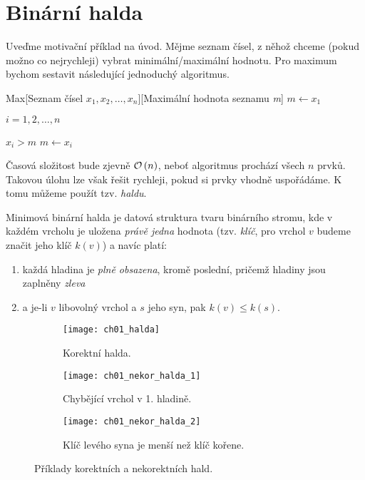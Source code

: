 \section{Binární halda}\label{sec:halda}
Uveďme motivační příklad na úvod. Mějme seznam čísel, z něhož chceme (pokud možno co nejrychleji) vybrat minimální/maximální hodnotu. Pro maximum bychom sestavit následující jednoduchý algoritmus.
\begin{pseudo}{Max}[Seznam čísel $x_1,x_2,\dots,x_n$][Maximální hodnota seznamu \textit{m}]
    $m\gets x_1$\\
    \begin{For}{$i=1,2,\dots,n$}
        \begin{If}{$x_i>m$}
            $m\gets x_i$
        \end{If}
    \end{For}
\end{pseudo}

Časová složitost bude zjevně $\mathcal{O}\left(n\right)$, neboť algoritmus prochází všech $n$ prvků. Takovou úlohu lze však řešit rychleji, pokud si prvky vhodně uspořádáme. K tomu můžeme použít tzv. \emph{haldu}. 
\begin{definition}\label{def:binarni_halda}
    Minimová binární halda je datová struktura tvaru binárního stromu, kde v každém vrcholu je uložena \emph{právě jedna} hodnota (tzv. \emph{klíč}, pro vrchol $v$ budeme značit jeho klíč $k(v)$) a navíc platí:
    \begin{enumerate}[label=(\roman*)]
        \item\label{binhalda_podminka_1} každá hladina je \emph{plně obsazena}, kromě poslední, pričemž hladiny jsou zaplněny \emph{zleva}
        \item\label{binhalda_podminka_2} a je-li $v$ libovolný vrchol a $s$ jeho syn, pak $k(v)\leqslant k(s)$.
    \end{enumerate}
\end{definition}

\begin{figure}[h]
    \centering
    \begin{subfigure}{6cm}
        \centering
        \texttt{[image: ch01\_halda]}
        \caption{Korektní halda.}
        \label{subfig:korektni_halda}
    \end{subfigure}
    \quad
    \begin{subfigure}{5cm}
        \centering
        \texttt{[image: ch01\_nekor\_halda\_1]}
        \caption{Chybějící vrchol v 1. hladině.}
        \label{subfig:nekorektni_halda_1}
    \end{subfigure}
    \quad
    \begin{subfigure}{5cm}
        \centering
        \texttt{[image: ch01\_nekor\_halda\_2]}
        \caption{Klíč levého syna je menší než klíč kořene.}
        \label{subfig:nekorektni_halda_2}
    \end{subfigure}
    \caption{Příklady korektních a nekorektních hald.}
    \label{fig:halda_modely}
\end{figure}

